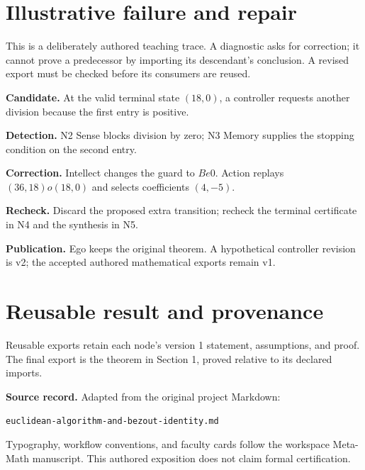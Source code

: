 \documentclass[preprint,12pt,aps,pra,showkeys,amsmath,amssymb,superscriptaddress,floatfix]{revtex4-2}
\theoremstyle{definition}
\theoremstyle{remark}
\newcommand{\field}[2]{\par\smallskip\noindent\textbf{#1.} #2\par}
\begin{document}
\section{Illustrative failure and repair}

This is a deliberately authored teaching trace. A diagnostic asks for
correction; it cannot prove a predecessor by importing its descendant's
conclusion. A revised export must be checked before its consumers are
reused.

\field{Candidate}{At the valid terminal state \((18,0)\), a controller requests another
division because the first entry is positive.}

\field{Detection}{N2 Sense blocks division by zero; N3 Memory supplies the stopping
condition on the second entry.}

\field{Correction}{Intellect changes the guard to \(B
e0\). Action replays \((36,18)    o(18,0)\) and selects coefficients
\((4,-5)\).}

\field{Recheck}{Discard the proposed extra transition; recheck the terminal certificate
in N4 and the synthesis in N5.}

\field{Publication}{Ego keeps the original theorem. A hypothetical controller revision is
v2; the accepted authored mathematical exports remain v1.}

\section{Reusable result and provenance}
Reusable exports retain each node's version 1 statement, assumptions, and proof.
The final export is the theorem in Section 1, proved relative to its declared imports.

\smallskip\noindent\textbf{Source record.} Adapted from the original project Markdown:
\par\noindent\nolinkurl{euclidean-algorithm-and-bezout-identity.md}\par
Typography, workflow conventions, and faculty cards follow the workspace Meta-Math
manuscript. This authored exposition does not claim formal certification.
\end{document}
